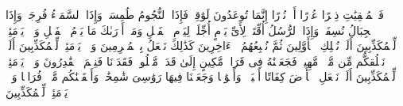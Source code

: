 \startbuffer[\q:77:5]
فَٱلۡمُلۡقِیَٰتِ ذِكۡرًا%
\stopbuffer
\startbuffer[\q:77:6]
عُذۡرًا أَوۡ نُذۡرًا%
\stopbuffer
\startbuffer[\q:77:7]
إِنَّمَا تُوعَدُونَ لَوَٰقِعࣱ%
\stopbuffer
\startbuffer[\q:77:8]
فَإِذَا ٱلنُّجُومُ طُمِسَتۡ%
\stopbuffer
\startbuffer[\q:77:9]
وَإِذَا ٱلسَّمَاۤءُ فُرِجَتۡ%
\stopbuffer
\startbuffer[\q:77:10]
وَإِذَا ٱلۡجِبَالُ نُسِفَتۡ%
\stopbuffer
\startbuffer[\q:77:11]
وَإِذَا ٱلرُّسُلُ أُقِّتَتۡ%
\stopbuffer
\startbuffer[\q:77:12]
لِأَیِّ یَوۡمٍ أُجِّلَتۡ%
\stopbuffer
\startbuffer[\q:77:13]
لِیَوۡمِ ٱلۡفَصۡلِ%
\stopbuffer
\startbuffer[\q:77:14]
وَمَاۤ أَدۡرَىٰكَ مَا یَوۡمُ ٱلۡفَصۡلِ%
\stopbuffer
\startbuffer[\q:77:15]
وَیۡلࣱ یَوۡمَئِذࣲ لِّلۡمُكَذِّبِینَ%
\stopbuffer
\startbuffer[\q:77:16]
أَلَمۡ نُهۡلِكِ ٱلۡأَوَّلِینَ%
\stopbuffer
\startbuffer[\q:77:17]
ثُمَّ نُتۡبِعُهُمُ ٱلۡءَاخِرِینَ%
\stopbuffer
\startbuffer[\q:77:18]
كَذَٰلِكَ نَفۡعَلُ بِٱلۡمُجۡرِمِینَ%
\stopbuffer
\startbuffer[\q:77:19]
وَیۡلࣱ یَوۡمَئِذࣲ لِّلۡمُكَذِّبِینَ%
\stopbuffer
\startbuffer[\q:77:20]
أَلَمۡ نَخۡلُقكُّم مِّن مَّاۤءࣲ مَّهِینࣲ%
\stopbuffer
\startbuffer[\q:77:21]
فَجَعَلۡنَٰهُ فِی قَرَارࣲ مَّكِینٍ%
\stopbuffer
\startbuffer[\q:77:22]
إِلَىٰ قَدَرࣲ مَّعۡلُومࣲ%
\stopbuffer
\startbuffer[\q:77:23]
فَقَدَرۡنَا فَنِعۡمَ ٱلۡقَٰدِرُونَ%
\stopbuffer
\startbuffer[\q:77:24]
وَیۡلࣱ یَوۡمَئِذࣲ لِّلۡمُكَذِّبِینَ%
\stopbuffer
\startbuffer[\q:77:25]
أَلَمۡ نَجۡعَلِ ٱلۡأَرۡضَ كِفَاتًا%
\stopbuffer
\startbuffer[\q:77:26]
أَحۡیَاۤءࣰ وَأَمۡوَٰتࣰا%
\stopbuffer
\startbuffer[\q:77:27]
وَجَعَلۡنَا فِیهَا رَوَٰسِیَ شَٰمِخَٰتࣲ وَأَسۡقَیۡنَٰكُم مَّاۤءࣰ فُرَاتࣰا%
\stopbuffer
\startbuffer[\q:77:28]
وَیۡلࣱ یَوۡمَئِذࣲ لِّلۡمُكَذِّبِینَ%
\stopbuffer
